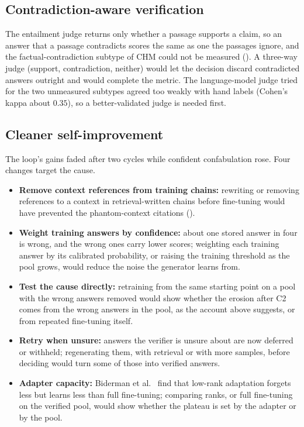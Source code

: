 \subsection{Contradiction-aware verification}
\label{sec:future-refutation}

The entailment judge returns only whether a passage supports a claim, so an answer that a passage contradicts scores the same as one the passages ignore, and the factual-contradiction subtype of CHM could not be measured (). A three-way judge (support, contradiction, neither) would let the decision discard contradicted answers outright and would complete the metric. The language-model judge tried for the two unmeasured subtypes agreed too weakly with hand labels (Cohen's kappa about $0.35$), so a better-validated judge is needed first.

\subsection{Cleaner self-improvement}
\label{sec:future-lora}

The loop's gains faded after two cycles while confident confabulation rose. Four changes target the cause.
\begin{itemize}
    \item \textbf{Remove context references from training chains:} rewriting or removing references to a context in retrieval-written chains before fine-tuning would have prevented the phantom-context citations ().
    \item \textbf{Weight training answers by confidence:} about one stored answer in four is wrong, and the wrong ones carry lower scores; weighting each training answer by its calibrated probability, or raising the training threshold as the pool grows, would reduce the noise the generator learns from.
    \item \textbf{Test the cause directly:} retraining from the same starting point on a pool with the wrong answers removed would show whether the erosion after C2 comes from the wrong answers in the pool, as the account above suggests, or from repeated fine-tuning itself.
    \item \textbf{Retry when unsure:} answers the verifier is unsure about are now deferred or withheld; regenerating them, with retrieval or with more samples, before deciding would turn some of those into verified answers.
    \item \textbf{Adapter capacity:} Biderman et al.~\cite{biderman2024lora} find that low-rank adaptation forgets less but learns less than full fine-tuning; comparing ranks, or full fine-tuning on the verified pool, would show whether the plateau is set by the adapter or by the pool.
\end{itemize}

